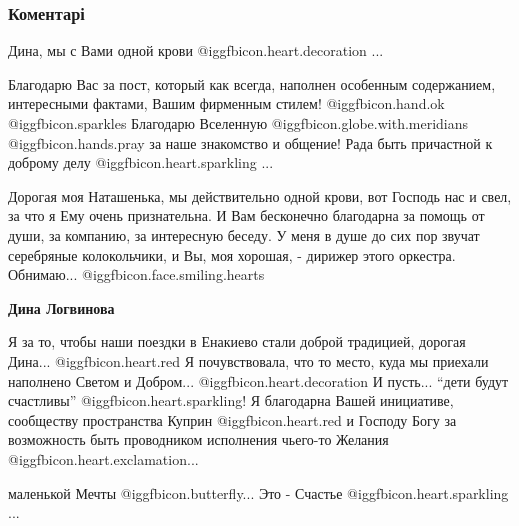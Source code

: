  
 
 
 
 
\subsubsection{Коментарі}

\begin{itemize} %

Дина, мы с Вами одной
крови @igg{fbicon.heart.decoration} ...

Благодарю Вас за пост, который как всегда, наполнен особенным содержанием,
интересными фактами, Вашим фирменным стилем!
@igg{fbicon.hand.ok}  @igg{fbicon.sparkles} Благодарю
Вселенную @igg{fbicon.globe.with.meridians}  @igg{fbicon.hands.pray}  за наше знакомство и
общение! Рада быть причастной к доброму делу
@igg{fbicon.heart.sparkling} ...

\begin{itemize} %

Дорогая моя Наташенька, мы действительно одной крови, вот Господь нас и свел,
за что я Ему очень признательна. И Вам бесконечно благодарна за помощь от души,
за компанию, за интересную беседу. У меня в душе до сих пор звучат серебряные
колокольчики, и Вы, моя хорошая, - дирижер этого оркестра. Обнимаю... @igg{fbicon.face.smiling.hearts} 

\textbf{Дина Логвинова} 

Я за то, чтобы наши поездки в Енакиево стали доброй традицией, дорогая Дина... @igg{fbicon.heart.red} Я
почувствовала, что то место, куда мы приехали наполнено Светом и Добром... @igg{fbicon.heart.decoration}  И
пусть... \enquote{дети будут счастливы} @igg{fbicon.heart.sparkling}! Я благодарна Вашей инициативе, сообществу
пространства Куприн @igg{fbicon.heart.red} и Господу Богу за возможность быть проводником исполнения
чьего-то Желания @igg{fbicon.heart.exclamation}...

маленькой Мечты @igg{fbicon.butterfly}... Это - Счастье  @igg{fbicon.heart.sparkling} ...

\end{itemize} %


\end{itemize}
